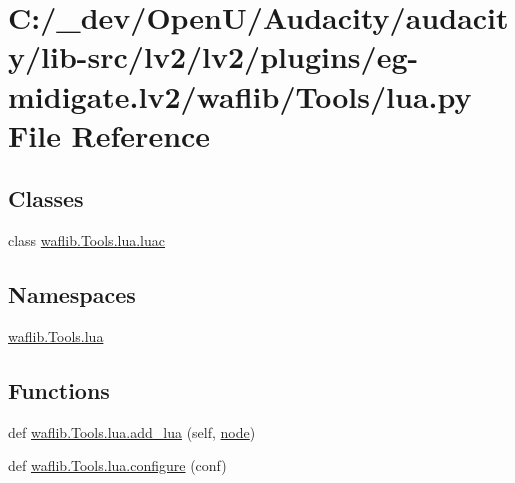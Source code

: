 \hypertarget{lv2_2plugins_2eg-midigate_8lv2_2waflib_2_tools_2lua_8py}{}\section{C\+:/\+\_\+dev/\+Open\+U/\+Audacity/audacity/lib-\/src/lv2/lv2/plugins/eg-\/midigate.lv2/waflib/\+Tools/lua.py File Reference}
\label{lv2_2plugins_2eg-midigate_8lv2_2waflib_2_tools_2lua_8py}
\subsection*{Classes}
\begin{DoxyCompactItemize}
\item 
class \hyperlink{classwaflib_1_1_tools_1_1lua_1_1luac}{waflib.\+Tools.\+lua.\+luac}
\end{DoxyCompactItemize}
\subsection*{Namespaces}
\begin{DoxyCompactItemize}
\item 
 \hyperlink{namespacewaflib_1_1_tools_1_1lua}{waflib.\+Tools.\+lua}
\end{DoxyCompactItemize}
\subsection*{Functions}
\begin{DoxyCompactItemize}
\item 
def \hyperlink{namespacewaflib_1_1_tools_1_1lua_a68e603a9eb9ca00ea36ac02d5fd4e360}{waflib.\+Tools.\+lua.\+add\+\_\+lua} (self, \hyperlink{structnode}{node})
\item 
def \hyperlink{namespacewaflib_1_1_tools_1_1lua_a5419673a215f8866f529e47be9f846e5}{waflib.\+Tools.\+lua.\+configure} (conf)
\end{DoxyCompactItemize}
